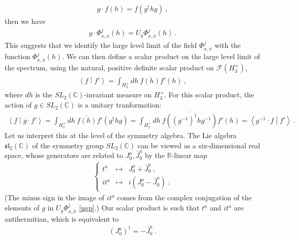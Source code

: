 \documentclass[12pt, a4paper, notitlepage, twoside]{report}
\numberwithin{equation}{section}
\theoremstyle{break}
\begin{document}
\begin{align}
 g\cdot f(h) = f(g^\dagger h g)\ ,
\end{align}
then we have 
\begin{align}
 g\cdot \Phi^j_{x,\bar{x}}(h) = U_g \Phi^j_{x,\bar{x}}(h)\ .
\end{align}
This suggests that we identify the large level limit of the field $\Phi^j_{x,\bar{x}}$ with the function $\Phi^j_{x,\bar{x}}(h)$. 
We can then define a scalar product on the large level limit of the spectrum, using the natural, positive definite scalar product on $\mathcal{F}(H_3^+)$, 
\begin{align}
 \left\langle f \middle| f' \right\rangle = \int_{H_3^+} dh\ \overline{f(h)} f'(h)\ ,
\end{align}
where $dh$ is the $SL_2({\mathbb{C}})$-invariant measure on $H_3^+$.
For this scalar product, the action of $g\in SL_2({\mathbb{C}})$ is a unitary tranformation:
\begin{align}
 \left\langle f \middle| g\cdot f'\right\rangle = \int_{H_3^+}dh\ \overline{f(h)} f'(g^\dagger h g) = \int_{H_3^+}dh\ \overline{f((g^{-1})^\dagger h g^{-1})} f'(h) = \left\langle g^{-1}\cdot f \middle| f'\right\rangle\ .
\end{align}
Let us interpret this at the level of the symmetry algebra.
The Lie algebra $\mathfrak{sl}_2({\mathbb{C}})$ of the symmetry group $SL_2({\mathbb{C}})$ can be viewed as a six-dimensional real space, whose generators are related to $J^a_0, \bar{J}^a_0$ by the ${\mathbb{R}}$-linear map
\begin{align}
 \left\{\begin{array}{lcl} t^a & \mapsto & J_0^a + \bar{J}_0^a \ ,  \\ it^a & \mapsto & i(J^a_0 - \bar{J}^a_0)\ . \end{array}\right. 
\end{align}
(The minus sign in the image of $it^a$ comes from the complex conjugation of the elements of $g$ in $U_g\Phi^j_{x,\bar{x}}$ \eqref{ugp}.)
Our scalar product is such that $t^a$ and $it^a$ are antihermitian, which is equivalent to
\begin{align}
 (J^a_0)^\dagger = -\bar{J}^a_0\ .
\label{jzd}
\end{align}
\end{document}
